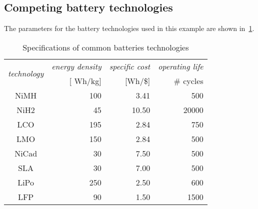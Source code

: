 \subsection{Competing battery technologies}

The parameters for the battery technologies used in this example are shown in~\cref{tab:batteries}.

\begin{table}[h]
	\label{tab:batteries}
	\begin{centering}
		\caption{Specifications of common batteries technologies}
	\end{centering}
	\centering{}\setlength\extrarowheight{0.5pt}{\footnotesize{}}
	\begin{tabular}{crrr}
		\multirow{2}{*}{{\footnotesize{}\tableColors}\emph{\footnotesize{}technology}} & \emph{\footnotesize{}energy density} & \emph{\footnotesize{}specific cost} & \emph{\footnotesize{}operating life}\tabularnewline
		                                                                               & {\footnotesize{}{[}
		Wh/kg{]}}                                                                      & {\footnotesize{}{[}Wh/\${]}}         & \# cycles\tabularnewline
		{\footnotesize{}NiMH}                                                          & {\footnotesize{}100}                 & {\footnotesize{}3.41}               & {\footnotesize{}500 }\tabularnewline
		{\footnotesize{}NiH2}                                                          & {\footnotesize{}45}                  & {\footnotesize{}10.50}              & {\footnotesize{}20000}\tabularnewline
		{\footnotesize{}LCO}                                                           & {\footnotesize{}195}                 & {\footnotesize{}2.84}               & {\footnotesize{}750}\tabularnewline
		{\footnotesize{}LMO}                                                           & {\footnotesize{}150}                 & {\footnotesize{}2.84}               & {\footnotesize{}500}\tabularnewline
		{\footnotesize{}NiCad}                                                         & {\footnotesize{}30}                  & {\footnotesize{}7.50}               & {\footnotesize{}500}\tabularnewline
		{\footnotesize{}SLA}                                                           & {\footnotesize{}30}                  & {\footnotesize{}7.00}               & {\footnotesize{}500}\tabularnewline
		{\footnotesize{}LiPo}                                                          & {\footnotesize{}250}                 & {\footnotesize{}2.50}               & {\footnotesize{}600}\tabularnewline
		{\footnotesize{}LFP}                                                           & {\footnotesize{}90}                  & {\footnotesize{}1.50}               & {\footnotesize{}1500}\tabularnewline
	\end{tabular}
\end{table}

